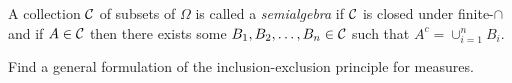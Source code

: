 \begin{definition}
    A collection ${\cal C}$ of subsets of $\Omega$ is called a \textit{semialgebra} if ${\cal C}$ is closed under finite-$\cap$ and if $A\in {\cal C}$ then there exists some $B_1, B_2 , \ldots , B_n \in {\cal C}$ such that $A^c = \cup_{i=1}^{n} B_i$.
    \label{def:semialgebra}
\end{definition}

\begin{exercise}
    Find a general formulation of the inclusion-exclusion principle for measures.
\end{exercise}
